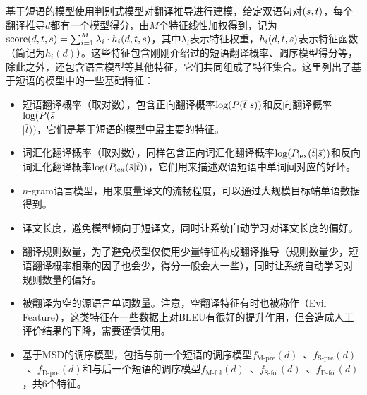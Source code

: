 \parinterval 基于短语的模型使用判别式模型对翻译推导进行建模，给定双语句对$({s},{t})$，每个翻译推导$d$都有一个模型得分，由$M$个特征线性加权得到，记为$\textrm{score}(d,{t},{s}) = \sum_{i=1}^{M} \lambda_i \cdot h_i (d,{t},{s})$，其中$\lambda_i$表示特征权重，$h_i (d,{t},{s})$表示特征函数（简记为$h_i (d)$）。这些特征包含刚刚介绍过的短语翻译概率、调序模型得分等，除此之外，还包含语言模型等其他特征，它们共同组成了特征集合。这里列出了基于短语的模型中的一些基础特征：

\begin{itemize}
\vspace{0.5em}
\item 短语翻译概率（取对数），包含正向翻译概率$\textrm{log}({P}(\bar{t}|\bar{s}))$和反向翻译概率$\textrm{log}({P}(\bar{s}$\\$|\bar{t}))$，它们是基于短语的模型中最主要的特征。
\vspace{0.5em}
\item 词汇化翻译概率（取对数），同样包含正向词汇化翻译概率$\textrm{log}({P}_{\textrm{lex}}(\bar{t}|\bar{s}))$和反向词汇化翻译概率$\textrm{log}({P}_{\textrm{lex}}(\bar{s}|\bar{t}))$，它们用来描述双语短语中单词间对应的好坏。
\item $n$-gram语言模型，用来度量译文的流畅程度，可以通过大规模目标端单语数据得到。
\vspace{0.5em}
\item 译文长度，避免模型倾向于短译文，同时让系统自动学习对译文长度的偏好。
\vspace{0.5em}
\item 翻译规则数量，为了避免模型仅使用少量特征构成翻译推导（规则数量少，短语翻译概率相乘的因子也会少，得分一般会大一些），同时让系统自动学习对规则数量的偏好。
\vspace{0.5em}
\item 被翻译为空的源语言单词数量。注意，空翻译特征有时也被称作{\small{}}（Evil Feature），这类特征在一些数据上对BLEU有很好的提升作用，但会造成人工评价结果的下降，需要谨慎使用。
\vspace{0.5em}
\item 基于MSD的调序模型，包括与前一个短语的调序模型$f_{\textrm{M-pre}}(d)$\ 、$f_{\textrm{S-pre}}(d)$\ 、$f_{\textrm{D-pre}}(d)$和与后一个短语的调序模型$f_{\textrm{M-fol}}(d)$\ 、$f_{\textrm{S-fol}}(d)$\ 、$f_{\textrm{D-fol}}(d)$，共6个特征。
\vspace{0.5em}
\end{itemize}


